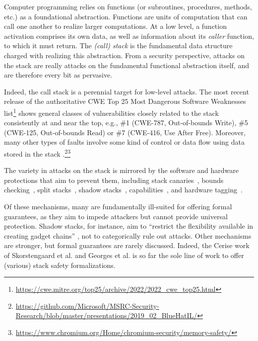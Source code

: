 \documentclass[10pt,conference]{ieeetran}%
\theoremstyle{definition}
\begin{document}
Computer programming relies on functions (or subroutines, procedures, methods, etc.)
as a foundational abstraction. Functions are units of computation that
can call one another to realize larger computations.
%
At a low level, a function activation comprises its own data, as
well as information about its \emph{caller} function, to which it must return.
The \emph{(call) stack} is the fundamental data structure charged with realizing
this abstraction. From a security perspective, attacks on the stack are really attacks
on the fundamental functional abstraction itself, and are therefore every bit as
pervasive.

Indeed, the call stack is a perennial target for low-level attacks.
%
The most recent release of the authoritative CWE Top 25
Most Dangerous Software Weaknesses
list\footnote{\url{https://cwe.mitre.org/top25/archive/2022/2022_cwe_top25.html}}
shows general classes of vulnerabilities closely related to the stack
consistently at and near the top, e.g., \#1 (CWE-787, Out-of-bounds Write), \#5 (CWE-125, Out-of-bounds Read) or \#7 (CWE-416, Use After Free).
%
Moreover, many other types of faults involve some kind of control or data flow
using data stored in the stack \cite{DBLP:conf/raid/VeendCB12,
  DBLP:conf/sp/SzekeresPWS13,
  DBLP:conf/sp/HuSACSL16}.\footnote{\url{https://github.com/Microsoft/MSRC-Security-Research/blob/master/presentations/2019_02_BlueHatIL/}}\footnote{\url{https://www.chromium.org/Home/chromium-security/memory-safety/}}

The variety in attacks on the stack is mirrored by the
software and hardware protections that aim to prevent them,
%
including stack canaries~\cite{Cowan+98},
bounds checking~\cite{NagarakatteZMZ09,NagarakatteZMZ10,DeviettiBMZ08},
split stacks~\cite{Kuznetsov+14},
shadow stacks~\cite{Dang+15,Shanbhogue+19},
capabilities~\cite{Woodruff+14,Chisnall+15,SkorstengaardLocal,SkorstengaardSTKJFP,Georges22:TempsDesCerises},
and hardware tagging~\cite{DBLP:conf/sp/RoesslerD18}.

Of these mechanisms, many are fundamentally ill-suited for offering formal guarantees,
as they aim to impede attackers but cannot provide universal protection. Shadow stacks,
for instance, aim to ``restrict the flexibility available in creating gadget chains''
\cite{Shanbhogue+19}, not to categorically
rule out attacks. Other mechanisms are stronger, but formal
guarantees are rarely discussed.
Indeed, the Cerise work of Skorstengaard et al. \cite{SkorstengaardSTKJFP} and
Georges et al. \cite{Georges22:TempsDesCerises} is so far the sole line of work
to offer (various) stack safety formalizations.
\end{document}
